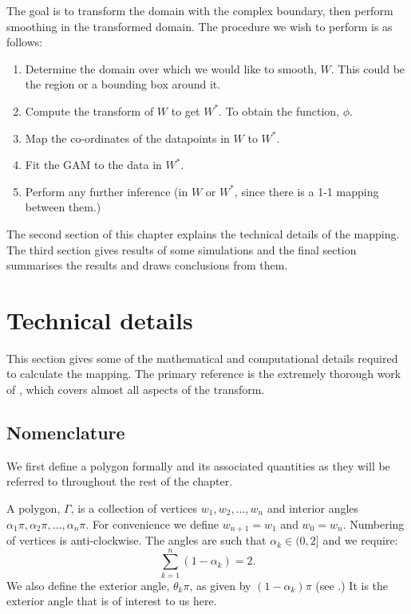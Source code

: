 The goal is to transform the domain with the complex boundary, then perform smoothing in the transformed domain. The procedure we wish to perform is as follows:

\begin{enumerate}
\item Determine the domain over which we would like to smooth, $W$. This could be the region or a bounding box around it.

\item Compute the \sch transform of $W$ to get $W^*$. To obtain the function, $\phi$.

\item Map the co-ordinates of the datapoints in $W$ to $W^*$.

\item Fit the GAM to the data in $W^*$.

\item Perform any further inference (in $W$ or $W^*$, since there is a 1-1 mapping between them.)
\end{enumerate}

The second section of this chapter explains the technical details of the mapping. The third section gives results of some simulations and the final section summarises the results and draws conclusions from them.

\section{Technical details}

This section gives some of the mathematical and computational details required to calculate the \sch mapping. The primary reference is the extremely thorough work of \cite{driscoll}, which covers almost all aspects of the \sch transform.

\subsection{Nomenclature}

We first define a polygon formally and its associated quantities as they will be referred to throughout the rest of the chapter.

A polygon, $\Gamma$, is a collection of vertices $w_1, w_2,\dots,w_n$ and interior angles $\alpha_1\pi, \alpha_2\pi, \dots, \alpha_n\pi$. For convenience we define $w_{n+1} = w_1$ and $w_0=w_n$. Numbering of vertices is anti-clockwise. The angles are such that $\alpha_k \in (0,2]$ and we require:
\begin{equation}
\sum_{k=1}^n (1-\alpha_k) = 2.
\end{equation}
We also define the exterior angle, $\theta_k\pi$, as given by $(1-\alpha_k)\pi$ (see .) It is the exterior angle that is of interest to us here.

